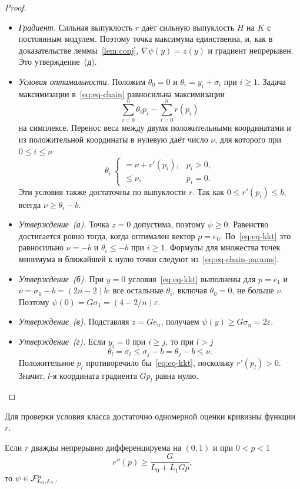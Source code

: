 \begin{proof}
\leavevmode
\begin{itemize}
\item \emph{Градиент.} Сильная выпуклость $r$ даёт сильную выпуклость $H$ на $K$ с постоянным модулем. Поэтому точка максимума единственна, и, как в доказательстве леммы~\ref{lem:conj}, $\nabla\psi(y)=z(y)$ и градиент непрерывен. Это утверждение~(д).
\item \emph{Условия оптимальности.} Положим $\theta_0=0$ и $\theta_i=y_i+\sigma_i$ при $i\ge1$. Задача максимизации в~\eqref{eq:eq-chain} равносильна максимизации
\[
 \sum_{i=0}^n\theta_ip_i-\sum_{i=0}^nr(p_i)
\]
на симплексе. Перенос веса между двумя положительными координатами и из положительной координаты в нулевую даёт число $\nu$, для которого при $0\le i\le n$
\begin{equation}\label{eq:eq-kkt}
 \theta_i\ \begin{cases}=\nu+r'(p_i), & p_i>0,\\ \le\nu, & p_i=0.\end{cases}
\end{equation}
Эти условия также достаточны по выпуклости $r$. Так как $0\le r'(p_i)\le b$, всегда $\nu\ge\theta_i-b$.
\item \emph{Утверждение~(а).} Точка $z=0$ допустима, поэтому $\psi\ge0$. Равенство достигается ровно тогда, когда оптимален вектор $p=e_0$. По~\eqref{eq:eq-kkt} это равносильно $\nu=-b$ и $\theta_i\le-b$ при $i\ge1$. Формулы для множества точек минимума и ближайшей к нулю точки следуют из~\eqref{eq:eq-chain-params}.
\item \emph{Утверждение~(б).} При $y=0$ условия~\eqref{eq:eq-kkt} выполнены для $p=e_1$ и $\nu=\sigma_1-b=(2n-2)b$: все остальные $\theta_i$, включая $\theta_0=0$, не больше $\nu$. Поэтому $\psi(0)=G\sigma_1=(4-2/n)\varepsilon$.
\item \emph{Утверждение~(в).} Подставляя $z=Ge_n$, получаем $\psi(y)\ge G\sigma_n=2\varepsilon$.
\item \emph{Утверждение~(г).} Если $y_i=0$ при $i\ge j$, то при $l>j$
\[
 \theta_l=\sigma_l\le\sigma_j-b=\theta_j-b\le\nu .
\]
Положительное $p_l$ противоречило бы~\eqref{eq:eq-kkt}, поскольку $r'(p_l)>0$. Значит, $l$-я координата градиента $Gp_l$ равна нулю.\qedhere
\end{itemize}
\end{proof}

Для проверки условия класса достаточно одномерной оценки кривизны функции $r$.

\begin{lemma}\label{lem:eq-conj-class}
Если $r$ дважды непрерывно дифференцируема на $(0,1)$ и при $0<p<1$
\begin{equation}\label{eq:eq-dual-curvature}
 r''(p)\ge\frac{G}{L_0+L_1Gp},
\end{equation}
то $\psi\in\mathcal F_{L_0,L_1}^n$.
\end{lemma}

